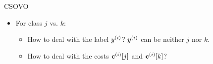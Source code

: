 \documentclass[11pt,compress,t,notes=noshow, xcolor=table]{beamer}
\begin{document}
\begin{vbframe}{CSOVO \href{https://proceedings.mlr.press/v39/lin14.pdf}{}}
\begin{itemize}
        \vspace{5pt}
        
        \item For class $j$ vs. $k$:
        \begin{itemize}
            \item How to deal with the label $y^{(i)}$? $y^{(i)}$ can be neither $j$ nor $k$.
            \vspace{5pt}
            
            \item How to deal with the costs $\mathbf{c}^{(i)}[j]$ and $\mathbf{c}^{(i)}[k]$?
            
        \end{itemize}
            
    \end{itemize}

\end{vbframe}
\end{document}
